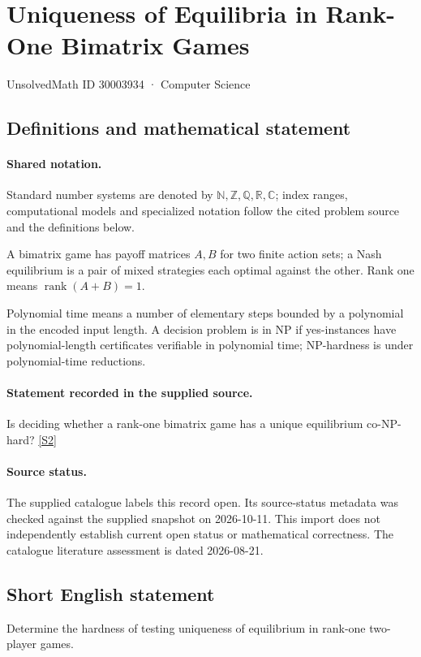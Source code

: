 \documentclass[11pt]{article}
\newcommand{\sref}[2]{\hyperlink{source:#1:#2}{[S#2]}}
\begin{document}
\setcounter{section}{30003933}
\section{Uniqueness of Equilibria in Rank-One Bimatrix Games}\label{30003934}
{\small\sffamily UnsolvedMath ID 30003934 · Computer Science}
\subsection{Definitions and mathematical statement}

\paragraph{Shared notation.}Standard number systems are denoted by $\mathbb N,\mathbb Z,\mathbb Q,\mathbb R,\mathbb C$; index ranges, computational models and specialized notation follow the cited problem source and the definitions below.


A bimatrix game has payoff matrices $A,B$ for two finite action sets; a Nash equilibrium is a pair of mixed strategies each optimal against the other. Rank one means $\operatorname{rank}(A+B)=1$.

Polynomial time means a number of elementary steps bounded by a polynomial in the encoded input length. A decision problem is in $\mathrm{NP}$ if yes-instances have polynomial-length certificates verifiable in polynomial time; NP-hardness is under polynomial-time reductions.
\paragraph{Statement recorded in the supplied source.}
Is deciding whether a rank-one bimatrix game has a unique equilibrium co-NP-hard? \sref{30003934}{2}
\paragraph{Source status.}
The supplied catalogue labels this record open. Its source-status metadata was checked against the supplied snapshot on 2026-10-11. This import does not independently establish current open status or mathematical correctness. The catalogue literature assessment is dated 2026-08-21.
\subsection{Short English statement}
Determine the hardness of testing uniqueness of equilibrium in rank-one two-player games.
\end{document}

